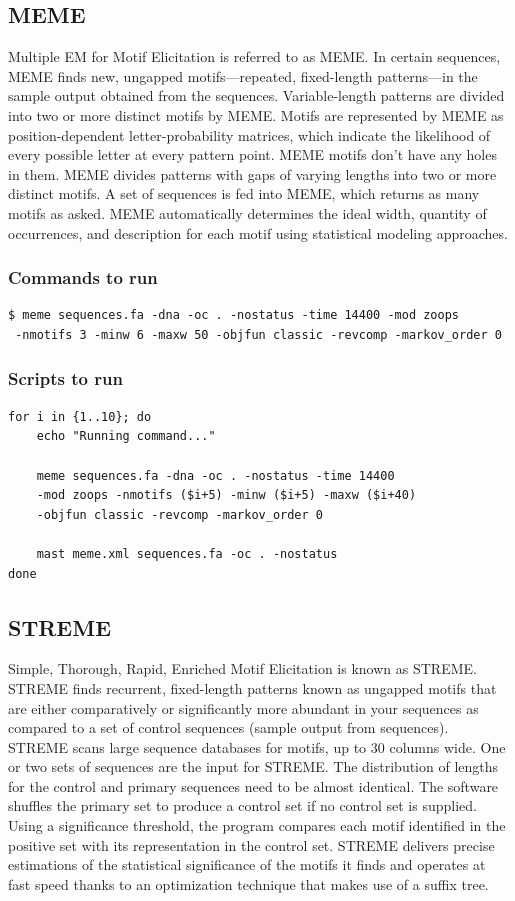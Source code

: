 \documentclass{article}
\begin{document}
\begin{Large}
\subsection{MEME}
Multiple EM for Motif Elicitation is referred to as MEME. In certain sequences, MEME finds new, ungapped motifs—repeated, fixed-length patterns—in the sample output obtained from the sequences. Variable-length patterns are divided into two or more distinct motifs by MEME. Motifs are represented by MEME as position-dependent letter-probability matrices, which indicate the likelihood of every possible letter at every pattern point. MEME motifs don't have any holes in them. MEME divides patterns with gaps of varying lengths into two or more distinct motifs. A set of sequences is fed into MEME, which returns as many motifs as asked. MEME automatically determines the ideal width, quantity of occurrences, and description for each motif using statistical modeling approaches.
\subsubsection{Commands to run}
\begin{verbatim}
$ meme sequences.fa -dna -oc . -nostatus -time 14400 -mod zoops 
 -nmotifs 3 -minw 6 -maxw 50 -objfun classic -revcomp -markov_order 0
\end{verbatim}

\subsubsection{Scripts to run}
\begin{verbatim}
for i in {1..10}; do
    echo "Running command..."
    
    meme sequences.fa -dna -oc . -nostatus -time 14400 
    -mod zoops -nmotifs ($i+5) -minw ($i+5) -maxw ($i+40) 
    -objfun classic -revcomp -markov_order 0

    mast meme.xml sequences.fa -oc . -nostatus
done
\end{verbatim}


\subsection{STREME}
Simple, Thorough, Rapid, Enriched Motif Elicitation is known as STREME. STREME finds recurrent, fixed-length patterns known as ungapped motifs that are either comparatively or significantly more abundant in your sequences as compared to a set of control sequences (sample output from sequences). STREME scans large sequence databases for motifs, up to 30 columns wide. One or two sets of sequences are the input for STREME. The distribution of lengths for the control and primary sequences need to be almost identical. The software shuffles the primary set to produce a control set if no control set is supplied. Using a significance threshold, the program compares each motif identified in the positive set with its representation in the control set. STREME delivers precise estimations of the statistical significance of the motifs it finds and operates at fast speed thanks to an optimization technique that makes use of a suffix tree.

\end{Large}
\end{document}
